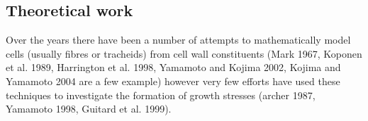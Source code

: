 \documentclass{article}
\begin{document}



%



\subsection{Theoretical work}
Over the years there have been a number of attempts to mathematically model
cells (usually fibres or tracheids) from cell wall constituents (Mark 1967,
Koponen et al. 1989, Harrington et al. 1998, Yamamoto and Kojima 2002, Kojima
and Yamamoto 2004 are a few example) however very few efforts have used these
techniques to investigate the formation of growth stresses (archer 1987,
Yamamoto 1998, Guitard et al. 1999).
\end{document}
